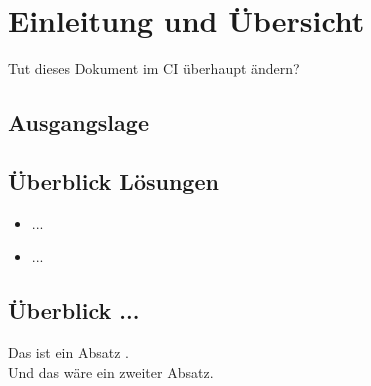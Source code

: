 \section{Einleitung und Übersicht}
Tut dieses Dokument im CI überhaupt ändern? 

\subsection{Ausgangslage}

\subsection{Überblick Lösungen}
\begin{itemize}
    \item ...
    \item ...
\end{itemize}

\subsection{Überblick ...}
Das ist ein Absatz \cite{good}. \\

Und das wäre ein zweiter Absatz. \cite{good}
